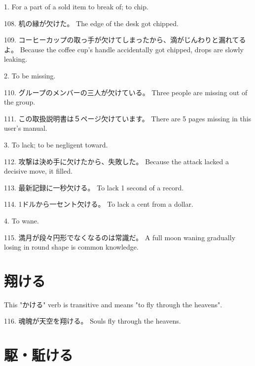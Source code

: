 \par{1. For a part of a sold item to break of; to chip. }

\par{108. 机の縁が欠けた。 \hfill\break
The edge of the desk got chipped. }

\par{109. コーヒーカップの取っ手が欠けてしまったから、滴がじんわりと漏れてるよ。 \hfill\break
Because the coffee cup's handle accidentally got chipped, drops are slowly leaking. }

\par{2. To be missing. }

\par{110. グループのメンバーの三人が欠けている。 \hfill\break
Three people are missing out of the group. }

\par{111. この取扱説明書は５ページ欠けています。 \hfill\break
There are 5 pages missing in this user's manual. }

\par{3. To lack; to be negligent toward. }

\par{112. 攻撃は決め手に欠けたから、失敗した。 \hfill\break
Because the attack lacked a decisive move, it filled. }

\par{113. 最新記録に一秒欠ける。 \hfill\break
To lack 1 second of a record. }

\par{114. 1ドルから一セント欠ける。 \hfill\break
To lack a cent from a dollar. }

\par{4. To wane. }

\par{115. 満月が段々円形でなくなるのは常識だ。 \hfill\break
A full moon waning gradually losing in round shape is common knowledge. }
      
\section{翔ける}
 
\par{ This "かける" verb is transitive and means "to fly through the heavens". }

\par{116. 魂魄が天空を翔ける。 \hfill\break
Souls fly through the heavens. }
      
\section{駆・駈ける}
 
